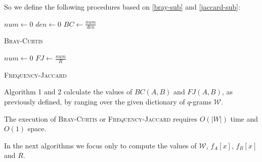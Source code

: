 So we define the following procedures based on \eqref{bray-sub} and \eqref{jaccard-sub}:\\

\begin{algorithm}[h]
	\small
	\DontPrintSemicolon
	\BlankLine
	$num \gets 0$\;
	$den \gets 0$\;
	$BC \gets \frac{num}{den}$\;
	\caption{\textsc{Bray-Curtis}}
	\label{alg:bray-curtis}
\end{algorithm}

\begin{algorithm}[h]
	\small
	\DontPrintSemicolon
	\BlankLine
	$num \gets 0$\;
	$FJ \gets \frac{num}{R}$\;
	\caption{\textsc{Frequency-Jaccard}}
	\label{alg:jaccard}
\end{algorithm}

Algorithm 1 and 2 calculate the values of $BC(A,B)$ and $FJ(A,B)$, as previously defined, by ranging over the given dictionary of $q$-grams $\mathcal{W}$.

\begin{lemma}
	The execution of \textsc{Bray-Curtis} or \textsc{Frequency-Jaccard} requires $O(|W|)$ time and $O(1)$ space. 	
\end{lemma}

In the next algorithms we focus only to compute the values of $\mathcal{W}$, $f_{A}[x]$, $f_{B}[x]$ and $R$.

\clearpage 
